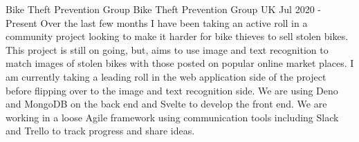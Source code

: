    \cventry
        {Bike Theft Prevention Group}
        {Bike Theft Prevention Group}
        {UK}
        {Jul 2020 - Present}
        {
            Over the last few months I have been taking an active roll in a community project looking to make it harder for bike thieves to sell stolen bikes. This project is still on going, but, aims to use image and text recognition to match images of stolen bikes with those posted on popular online market places. I am currently taking a leading roll in the web application side of the project before flipping over to the image and text recognition side. We are using Deno and MongoDB on the back end and Svelte to develop the front end. We are working in a loose Agile framework using communication tools including Slack and Trello to track progress and share ideas.\newline 
        }
